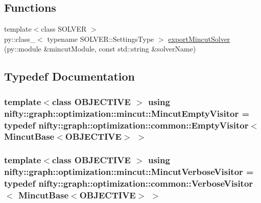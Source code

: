 \subsection*{Functions}
\begin{DoxyCompactItemize}
\item 
{\footnotesize template$<$class S\+O\+L\+V\+E\+R $>$ }\\py\+::class\+\_\+$<$ typename S\+O\+L\+V\+E\+R\+::\+Settings\+Type $>$ \hyperlink{namespacenifty_1_1graph_1_1optimization_1_1mincut_a04964bd5e4637ce88073ee84c12fa0c4}{export\+Mincut\+Solver} (py\+::module \&mincut\+Module, const std\+::string \&solver\+Name)
\end{DoxyCompactItemize}


\subsection{Typedef Documentation}
\hypertarget{namespacenifty_1_1graph_1_1optimization_1_1mincut_aac5eb28bbe885fb25185ac51f2afca82}{}
\subsubsection[{Mincut\+Empty\+Visitor}]{\setlength{\rightskip}{0pt plus 5cm}template$<$class O\+B\+J\+E\+C\+T\+I\+V\+E $>$ using {\bf nifty\+::graph\+::optimization\+::mincut\+::\+Mincut\+Empty\+Visitor} = typedef {\bf nifty\+::graph\+::optimization\+::common\+::\+Empty\+Visitor}$<$ {\bf Mincut\+Base}$<$O\+B\+J\+E\+C\+T\+I\+V\+E$>$ $>$}\label{namespacenifty_1_1graph_1_1optimization_1_1mincut_aac5eb28bbe885fb25185ac51f2afca82}
\hypertarget{namespacenifty_1_1graph_1_1optimization_1_1mincut_aa2aaddaf5d6cc62c6016cfafb267afdd}{}
\subsubsection[{Mincut\+Verbose\+Visitor}]{\setlength{\rightskip}{0pt plus 5cm}template$<$class O\+B\+J\+E\+C\+T\+I\+V\+E $>$ using {\bf nifty\+::graph\+::optimization\+::mincut\+::\+Mincut\+Verbose\+Visitor} = typedef {\bf nifty\+::graph\+::optimization\+::common\+::\+Verbose\+Visitor}$<$ {\bf Mincut\+Base}$<$O\+B\+J\+E\+C\+T\+I\+V\+E$>$ $>$}\label{namespacenifty_1_1graph_1_1optimization_1_1mincut_aa2aaddaf5d6cc62c6016cfafb267afdd}
\hypertarget{namespacenifty_1_1graph_1_1optimization_1_1mincut_a95cebea00c03e9d82bf37342468c1fd9}{}
